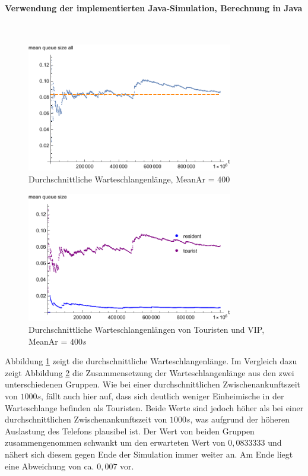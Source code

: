 \paragraph{Verwendung der implementierten Java-Simulation, Berechnung in Java}
\label{JavaVIPPhone400}
\\
\begin{figure}[htpb]
	\centering
	\includegraphics[width=0.8\textwidth]{abbildungen/1_Phone_VIP/Arrival_400_Serve_100_dur_1000000_Skip_0/MeanQueueSizeAll.pdf}
	\caption{Durchschnittliche Warteschlangenlänge, MeanAr = 400}
	\label{fig:MQSVIP400ALL}
\end{figure}

\begin{figure}[htpb]
	\centering
	\includegraphics[width=0.8\textwidth]{abbildungen/1_Phone_VIP/Arrival_400_Serve_100_dur_1000000_Skip_0/MeanQueueSizeTouristAndResident.pdf}
	\caption{Durchschnittliche Warteschlangenlängen von Touristen und VIP, MeanAr = $400s$}
	\label{fig:MQSVIP400VGL}
\end{figure}

Abbildung \ref{fig:MQSVIP400ALL} zeigt die durchschnittliche Warteschlangenlänge. Im Vergleich dazu zeigt Abbildung \ref{fig:MQSVIP400VGL} die Zusammensetzung der Warteschlangenlänge aus den zwei unterschiedenen Gruppen. Wie bei einer durchschnittlichen Zwischenankunftszeit von $1000s$, fällt auch hier auf, dass sich deutlich weniger Einheimische in der Warteschlange befinden als Touristen. Beide Werte sind jedoch höher als bei einer durchschnittlichen Zwischenankunftszeit von $1000s$, was aufgrund der höheren Auslastung des Telefons plausibel ist. Der Wert von beiden Gruppen zusammengenommen schwankt um den erwarteten Wert von $0,0833333$ und nähert sich diesem gegen Ende der Simulation immer weiter an. Am Ende liegt eine Abweichung von ca. $0,007$ vor.

